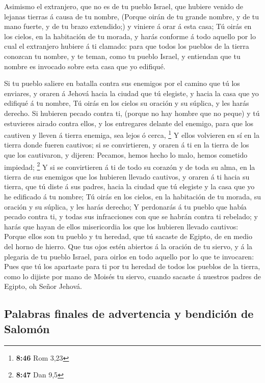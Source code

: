  Asimismo el extranjero, que no es de tu pueblo Israel, que
hubiere venido de lejanas tierras á causa de tu nombre, 
(Porque oirán de tu grande nombre, y de tu mano fuerte, y de tu brazo
extendido;) y viniere á orar á esta casa;  Tú oirás en los
cielos, en la habitación de tu morada, y harás conforme á todo aquello
por lo cual el extranjero hubiere á ti clamado: para que todos los
pueblos de la tierra conozcan tu nombre, y te teman, como tu pueblo
Israel, y entiendan que tu nombre es invocado sobre esta casa que yo
edifiqué.

 Si tu pueblo saliere en batalla contra sus enemigos por el
camino que tú los enviares, y oraren á Jehová hacia la ciudad que tú
elegiste, y hacia la casa que yo edifiqué á tu nombre,  Tú
oirás en los cielos su oración y su súplica, y les harás derecho.
 Si hubieren pecado contra ti, (porque no hay hombre que no
peque) y tú estuvieres airado contra ellos, y los entregares delante del
enemigo, para que los cautiven y lleven á tierra enemiga, sea lejos ó
cerca, \footnote{\textbf{8:46} Rom 3,23}  Y ellos volvieren
en sí en la tierra donde fueren cautivos; si se convirtieren, y oraren á
ti en la tierra de los que los cautivaron, y dijeren: Pecamos, hemos
hecho lo malo, hemos cometido impiedad; \footnote{\textbf{8:47} Dan 9,5}
 Y si se convirtieren á ti de todo su corazón y de toda su
alma, en la tierra de sus enemigos que los hubieren llevado cautivos, y
oraren á ti hacia su tierra, que tú diste á sus padres, hacia la ciudad
que tú elegiste y la casa que yo he edificado á tu nombre; 
Tú oirás en los cielos, en la habitación de tu morada, su oración y su
súplica, y les harás derecho;  Y perdonarás á tu pueblo que
había pecado contra ti, y todas sus infracciones con que se habrán
contra ti rebelado; y harás que hayan de ellos misericordia los que los
hubieren llevado cautivos:  Porque ellos son tu pueblo y tu
heredad, que tú sacaste de Egipto, de en medio del horno de hierro.
 Que tus ojos estén abiertos á la oración de tu siervo, y á
la plegaria de tu pueblo Israel, para oirlos en todo aquello por lo que
te invocaren:  Pues que tú los apartaste para ti por tu
heredad de todos los pueblos de la tierra, como lo dijiste por mano de
Moisés tu siervo, cuando sacaste á nuestros padres de Egipto, oh Señor
Jehová.

\hypertarget{palabras-finales-de-advertencia-y-bendiciuxf3n-de-salomuxf3n}{%
\subsection{Palabras finales de advertencia y bendición de
Salomón}\label{palabras-finales-de-advertencia-y-bendiciuxf3n-de-salomuxf3n}}

